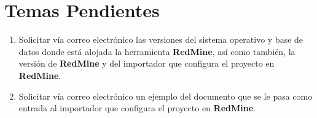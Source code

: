 \documentclass{article}
\begin{document}
\section{Temas Pendientes}
\begin{enumerate}
\item Solicitar v\'{i}a correo electr\'{o}nico las versiones del sistema operativo y base de datos donde est\'{a} alojada la herramienta \textbf{RedMine},
as\'{i} como tambi\'{e}n, la versi\'{o}n de \textbf{RedMine} y del importador que configura el proyecto en \textbf{RedMine}.
\item Solicitar v\'{i}a correo electr\'{o}nico un ejemplo del documento que se le pasa como entrada al importador que configura el proyecto en \textbf{RedMine}.
\end{enumerate}
\end{document}
